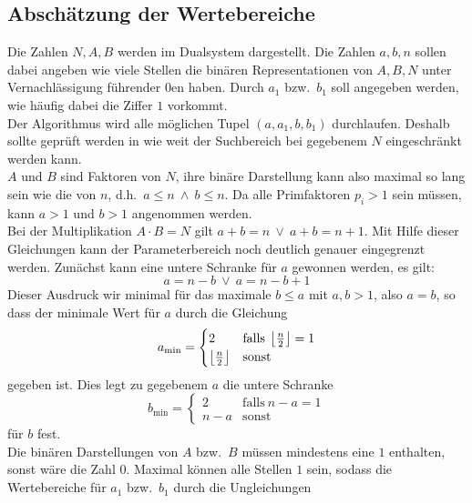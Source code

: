 \subsection{Abschätzung der Wertebereiche}\label{sec:parameterspace}
Die Zahlen $N,A,B$ werden im Dualsystem dargestellt. Die Zahlen $a,b,n$ sollen dabei angeben wie viele Stellen die binären Representationen von $A,B,N$ unter Vernachlässigung führender $0$en haben. Durch $a_1$ bzw.\ $b_1$ soll angegeben werden, wie häufig dabei die Ziffer $1$ vorkommt. \\
Der Algorithmus wird alle möglichen Tupel $\left(a,a_1,b,b_1\right)$ durchlaufen. Deshalb sollte geprüft werden in wie weit der Suchbereich bei gegebenem $N$ eingeschränkt werden kann.\\
$A$ und $B$ sind Faktoren von $N$, ihre binäre Darstellung kann also maximal so lang sein wie die von $n$, d.h.\ $a\leq n\:\wedge\: b\leq n$. Da alle Primfaktoren $p_i > 1$ sein müssen, kann $a>1$ und $b>1$ angenommen werden. \\
Bei der Multiplikation $A\cdot B =N$ gilt $a+b=n\:\vee\:a+b=n+1$. Mit Hilfe dieser Gleichungen kann der Parameterbereich noch deutlich genauer eingegrenzt werden. Zunächst kann eine untere Schranke für $a$ gewonnen werden, es gilt:
\begin{equation*}
		a=n-b \:\vee\: a=n-b+1
\end{equation*}
Dieser Ausdruck wir minimal für das maximale $b \leq a$ mit $a,b>1$, also $a=b$, so dass der minimale Wert für $a$ durch die Gleichung
\begin{equation}
		a_\mathrm{min}=\begin{cases}
						2 & \mathrm{falls}\:\left\lfloor\frac{n}{2}\right\rfloor = 1 \\
						\left\lfloor\frac{n}{2}\right\rfloor & \mathrm{sonst}
		\end{cases}\label{eq:amin}
\end{equation}
gegeben ist. Dies legt zu gegebenem $a$ die untere Schranke
\begin{equation}
		b_\mathrm{min}=\begin{cases}
						2 & \mathrm{falls}\:n-a=1 \\
						n-a & \mathrm{sonst}
		\end{cases}\label{eq:amax}
\end{equation}
für $b$ fest.\\
Die binären Darstellungen von $A$ bzw.\ $B$ müssen mindestens eine $1$ enthalten, sonst wäre die Zahl $0$. Maximal können alle Stellen $1$ sein, sodass die Wertebereiche für $a_1$ bzw.\ $b_1$ durch die Ungleichungen
